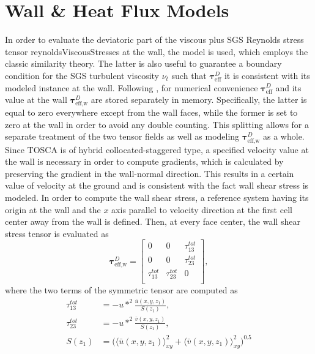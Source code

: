 \section{Wall \& Heat Flux Models}
\label{sec:wallHeatFluxModel}
In order to evaluate the deviatoric part of the viscous plus SGS Reynolds stress tensor \gls{reynoldsViscousStresses} at the wall, the \cite{Shumann1975} model is used, which employs the classic \cite{MoninObukhov1954} similarity theory. The latter is also useful to guarantee a boundary condition for the SGS turbulent viscosity $\nu_t$ such that $\mathbf{\tau}_\text{eff}^D$ it is consistent with its modeled instance at the wall. Following \cite{NAWEA2016}, for numerical convenience $\mathbf{\tau}_\text{eff}^D$ and its value at the wall $\mathbf{\tau}_\text{eff,w}^D$ are stored separately in memory. Specifically, the latter is equal to zero everywhere except from the wall faces, while the former is set to zero at the wall in order to avoid any double counting. This splitting allows for a separate treatment of the two tensor fields as well as modeling $\mathbf{\tau}_\text{eff,w}^D$ as a whole. Since TOSCA is of hybrid collocated-staggered type, a specified velocity value at the wall is necessary in order to compute gradients, which is calculated by preserving the gradient in the wall-normal direction. This results in a certain value of velocity at the ground and is consistent with the fact wall shear stress is modeled. In order to compute the wall shear stress, a reference system having its origin at the wall and the $x$ axis parallel to velocity direction at the first cell center away from the wall is defined. Then, at every face center, the wall shear stress tensor is evaluated as
\begin{equation}
	\mathbf{\tau}_\text{eff,w}^D = 
	\begin{bmatrix}
		0 & 0 & \tau_{13}^{tot} \\
		0 & 0 & \tau_{23}^{tot} \\
		\tau_{13}^{tot} & \tau_{23}^{tot} & 0 \\
	\end{bmatrix},
\end{equation}
where the two terms of the symmetric tensor are computed as
\begin{align}
	\tau_{13}^{tot} &= -u*^2\frac{\bar{u}(x,y,z_1)}{S(z_1)}, \label{eq:Rwall13} \\
	\tau_{23}^{tot} &= -u*^2\frac{\bar{v}(x,y,z_1)}{S(z_1)}, \label{eq:Rwall23} \\
	S(z_1) &= \big(\langle\bar{u}(x,y,z_1)\rangle_{xy}^2+\langle\bar{v}(x,y,z_1)\rangle_{xy}^2\big)^{0.5}
\end{align}
